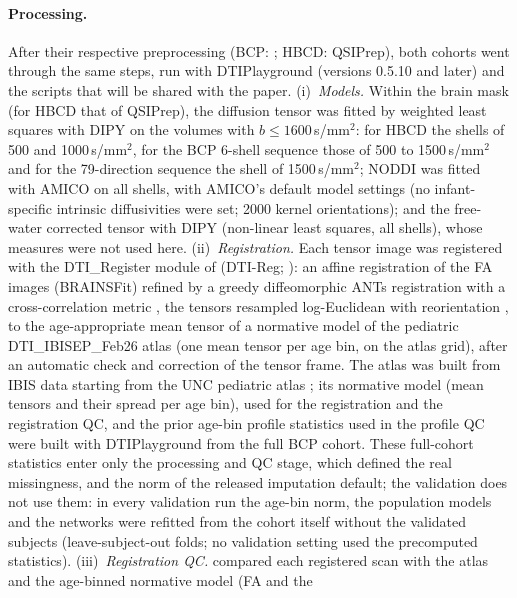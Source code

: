 \documentclass[11pt]{article}
\begin{document}
\paragraph{Processing.} After their respective preprocessing (BCP: ; HBCD: QSIPrep), both cohorts
went through the same steps, run with DTIPlayground (versions 0.5.10 and later) and the scripts that will be shared with the
paper. (i)~\emph{Models.} Within the brain mask (for HBCD that of QSIPrep), the diffusion tensor was fitted by weighted
least squares with DIPY \citep{garyfallidis2014dipy} on the volumes with $b \le 1600$\,s/mm$^2$: for HBCD the shells
of 500 and 1000\,s/mm$^2$, for the BCP 6-shell sequence those of 500 to 1500\,s/mm$^2$ and for the 79-direction sequence
the shell of 1500\,s/mm$^2$; NODDI
\citep{zhang2012noddi} was fitted with AMICO \citep{daducci2015amico} on all shells, with AMICO's default model
settings (no infant-specific intrinsic diffusivities were set; 2000 kernel orientations); and the free-water corrected
tensor \citep{pasternak2009freewater,hoy2014fwdti} with DIPY (non-linear least squares, all shells), whose measures were
not used here. (ii)~\emph{Registration.} Each tensor image was registered with the DTI\_Register module of
 (DTI-Reg; \citealp{verde2014unc}): an affine registration of the FA images (BRAINSFit) refined by a
greedy diffeomorphic ANTs registration with a cross-correlation metric \citep{avants2008syn}, the tensors resampled
log-Euclidean with reorientation \citep{arsigny2006logeuclidean}, to the age-appropriate mean tensor of a normative model
of the pediatric DTI\_IBISEP\_Feb26 atlas (one mean tensor per age bin, on the atlas grid), after an automatic check and
correction of the tensor frame. The atlas was built from IBIS data starting from the UNC pediatric atlas
\citep{short2022atlas}; its normative model (mean tensors and their spread per age bin), used for the registration and the registration QC, and
the prior age-bin profile statistics used in the profile QC were built with DTIPlayground from the full BCP cohort. These
full-cohort statistics enter only the processing and QC stage, which defined the real missingness, and the norm of the
released imputation default; the validation does not use them: in every validation run the age-bin norm, the
population models and the networks were refitted from the cohort itself without the validated subjects (leave-subject-out
folds; no validation setting used the precomputed statistics). (iii)~\emph{Registration QC.}  compared each registered scan with the atlas and the age-binned normative model (FA and the
\end{document}

